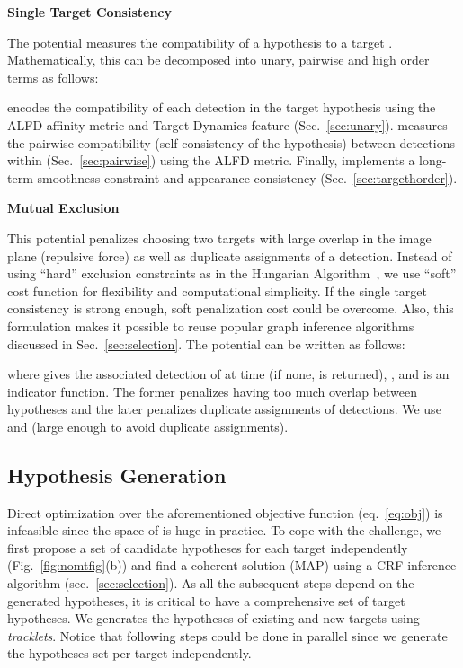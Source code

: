 \documentclass[10pt,twocolumn,letterpaper]{article}
\newcommand{\nosection}[1]{\vspace{2mm}\noindent\textbf{#1}}
\begin{document}
\nosection{Single Target Consistency}
\vspace{0.25em}

The potential measures the compatibility of a hypothesis  to a target . Mathematically, this can be decomposed into unary, pairwise and high order terms as follows:

{\scriptsize

}
 encodes the compatibility of each detection  in the target hypothesis  using the ALFD affinity metric and Target Dynamics feature (Sec.~\ref{sec:unary}). 
 measures the pairwise compatibility (self-consistency of the hypothesis) between detections within  (Sec.~\ref{sec:pairwise}) using the ALFD metric. 
Finally,  implements a long-term smoothness constraint and appearance consistency (Sec.~\ref{sec:targethorder}). 

\nosection{Mutual Exclusion}
\vspace{0.25em}

This potential penalizes choosing two targets with large overlap in the image plane (repulsive force) as well as duplicate assignments of a detection. 
Instead of using ``hard'' exclusion constraints as in the Hungarian Algorithm~\cite{Kuhn_NRLQ_55}, we use ``soft'' cost function for flexibility and computational simplicity. If the single target consistency is strong enough, soft penalization cost could be overcome. Also, this formulation makes it possible to reuse popular graph inference algorithms discussed in Sec.~\ref{sec:selection}. The potential can be written as follows:

{\footnotesize
 }
where  gives the associated detection of  at time  (if none,  is returned), , and  is an indicator function. 
The former penalizes having too much overlap between hypotheses and the later penalizes duplicate assignments of detections. We use  and  (large enough to avoid duplicate assignments).  


\subsection{Hypothesis Generation}
\label{sec:generation}

Direct optimization over the aforementioned objective function (eq.~\ref{eq:obj}) is infeasible since the space of  is huge in practice. To cope with the challenge, we first propose a set of candidate hypotheses  for each target independently (Fig.~\ref{fig:nomtfig}(b)) and find a coherent solution (MAP) using a CRF inference algorithm (sec.~\ref{sec:selection}). As all the subsequent steps depend on the generated hypotheses, it is critical to have a comprehensive set of target hypotheses. We generates the hypotheses of existing and new targets using \emph{tracklets}. Notice that following steps could be done in parallel since we generate the hypotheses set per target independently.
\end{document}
